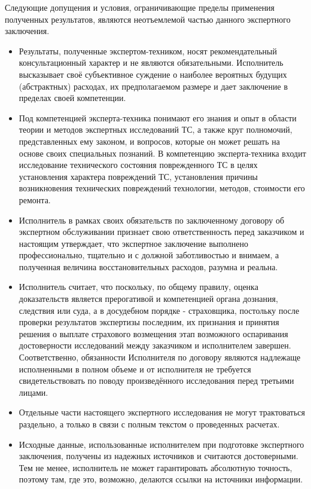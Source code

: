 Следующие допущения и условия, ограничивающие пределы применения полученных результатов, являются неотъемлемой частью данного экспертного заключения.
\begin{itemize}
\item  {Результаты, полученные экспертом-техником, носят рекомендательный консультационный характер и не являются обязательными. Исполнитель высказывает своё субъективное суждение о наиболее вероятных будущих (абстрактных) расходах, их предполагаемом размере и дает заключение в пределах своей компетенции.}
\item { Под компетенцией эксперта-техника понимают его знания и опыт в области теории и методов экспертных исследований ТС, а также круг полномочий, представленных ему законом, и вопросов, которые он может решать на основе своих специальных познаний.
В компетенцию эксперта-техника входит исследование технического состояния поврежденного ТС в целях установления характера повреждений ТС, установления причины возникновения технических повреждений технологии, методов, стоимости его ремонта.}
\item  {Исполнитель в рамках своих обязательств по заключенному договору об экспертном обслуживании признает свою ответственность перед заказчиком и настоящим утверждает, что экспертное заключение выполнено профессионально, тщательно и с должной заботливостью и внимаем, %
а полученная величина восстановительных расходов, разумна и реальна.}
\item  {Исполнитель считает, что поскольку, по общему правилу, оценка доказательств является прерогативой и компетенцией органа дознания, следствия или суда, а в досудебном порядке - страховщика, постольку после проверки результатов экспертизы последним, их признания и принятия решения о выплате страхового возмещения этап возможного оспаривания достоверности исследований между заказчиком и исполнителем завершен.
Соответственно, обязанности Исполнителя по договору являются надлежаще исполненными в полном объеме и от исполнителя не требуется свидетельствовать по поводу произведённого исследования перед третьими лицами.}
\item  {Отдельные части настоящего экспертного исследования не могут трактоваться раздельно, а только в связи с полным текстом о проведенных расчетах.}
\item  {Исходные данные, использованные исполнителем при подготовке экспертного заключения, получены из надежных источников и считаются достоверными. Тем не менее, исполнитель не может гарантировать абсолютную точность, поэтому там, где это, возможно, делаются ссылки на источники информации.}

\end{itemize}
